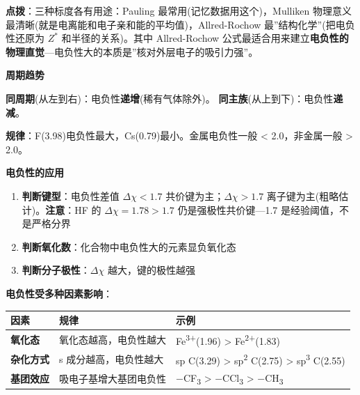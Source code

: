 \textbf{点拨}：三种标度各有用途：Pauling 最常用(记忆数据用这个)，Mulliken 物理意义最清晰(就是电离能和电子亲和能的平均值)，Allred-Rochow 最''结构化学''(把电负性还原为 \(Z^*\) 和半径的关系)。其中 Allred-Rochow 公式最适合用来建立\textbf{电负性的物理直觉}---电负性大的本质是''核对外层电子的吸引力强''。

\textbf{周期趋势}

\textbf{同周期}(从左到右)：电负性\textbf{递增}(稀有气体除外)。
\textbf{同主族}(从上到下)：电负性\textbf{递减}。

\textbf{规律}：F(3.98)电负性最大，Cs(0.79)最小。金属电负性一般 \textless{} 2.0，非金属一般 \textgreater{} 2.0。

\textbf{电负性的应用}

\begin{enumerate}
\def\labelenumi{\arabic{enumi}.}
\tightlist
\item
  \textbf{判断键型}：电负性差值 \(\Delta\chi < 1.7\) \箭 共价键为主；\(\Delta\chi > 1.7\) \箭 离子键为主(粗略估计)。\textbf{注意}：HF 的 \(\Delta\chi = 1.78 > 1.7\) 仍是强极性共价键---1.7 是经验阈值，不是严格分界
\item
  \textbf{判断氧化数}：化合物中电负性大的元素显负氧化态
\item
  \textbf{判断分子极性}：\(\Delta\chi\) 越大，键的极性越强
\end{enumerate}

\textbf{电负性受多种因素影响}：

{\def\LTcaptype{none} %
\begin{longtable}[]{@{}
  >{\raggedright\arraybackslash}p{}
  >{\raggedright\arraybackslash}p{}
  >{\raggedright\arraybackslash}p{}@{}}
\toprule\noalign{}
\begin{minipage}[b]{\linewidth}\raggedright
因素
\end{minipage} & \begin{minipage}[b]{\linewidth}\raggedright
规律
\end{minipage} & \begin{minipage}[b]{\linewidth}\raggedright
示例
\end{minipage} \\
\midrule\noalign{}
\endhead
\bottomrule\noalign{}
\endlastfoot
\textbf{氧化态} & 氧化态越高，电负性越大 & Fe\textsuperscript{3+}(1.96) \textgreater{} Fe\textsuperscript{2+}(1.83) \\
\textbf{杂化方式} & s 成分越高，电负性越大 & sp C(3.29) \textgreater{} sp\textsuperscript{2} C(2.75) \textgreater{} sp\textsuperscript{3} C(2.55) \\
\textbf{基团效应} & 吸电子基增大基团电负性 & −CF\textsubscript{3} \textgreater{} −CCl\textsubscript{3} \textgreater{} −CH\textsubscript{3} \\
\end{longtable}
}

